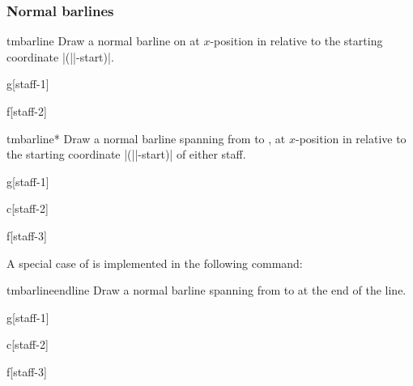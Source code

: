 \documentclass[11pt,a4paper]{ltxdoc}
\begin{document}
\subsubsection{Normal barlines}\label{sec:multistaff:barlines:normal}
\begin{docCommand}{tmbarline}{}
  Draw a normal barline on  at $x$-position  in 
  relative to the starting coordinate |(||-start)|.
\end{docCommand}
\begin{dispExample}
\begin{tmmultiplestaves}[0pt]%
  \begin{tmstaff}{g}[staff-1]
  \end{tmstaff}%
  \begin{tmstaff}{f}[staff-2]
  \end{tmstaff}%
\end{tmmultiplestaves}
\end{dispExample}
\begin{docCommand}{tmbarline*}{}
  Draw a normal barline spanning from  to 
  , at $x$-position  in relative to 
  the starting coordinate |(||-start)| of either staff.
\end{docCommand}
\begin{dispExample}
\begin{tmmultiplestaves}[0pt]%
  \begin{tmstaff}{g}[staff-1]
  \end{tmstaff}%
  \begin{tmstaff}{c}[staff-2]
  \end{tmstaff}%
  \begin{tmstaff}{f}[staff-3]
  \end{tmstaff}%
\end{tmmultiplestaves}
\end{dispExample}

A special case of  is implemented in the following command:
\begin{docCommand}{tmbarlineendline}{}
  Draw a normal barline spanning from  to 
   at the end of the line.
\end{docCommand}
\begin{dispExample}
\begin{tmmultiplestaves}[0pt]%
  \begin{tmstaff}{g}[staff-1]
  \end{tmstaff}%
  \begin{tmstaff}{c}[staff-2]
  \end{tmstaff}%
  \begin{tmstaff}{f}[staff-3]
  \end{tmstaff}%
\end{tmmultiplestaves}
\end{dispExample}
\end{document}
